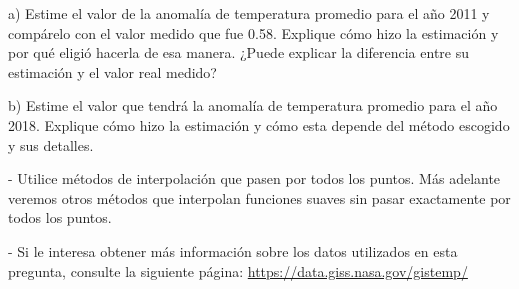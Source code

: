 \documentclass[letter, 11pt]{article}
\begin{document}
\vspace{0.5em}
\noindent a) Estime el valor de la anomalía de temperatura promedio para el año
2011 y compárelo con el valor medido que fue 0.58. Explique cómo hizo la
estimación y por qué eligió hacerla de esa manera. ¿Puede explicar la
diferencia entre su estimación y el valor real medido?

\vspace{0.5em}
\noindent b) Estime el valor que tendrá la anomalía de temperatura promedio
para el año 2018. Explique cómo hizo la estimación y cómo esta depende del
método escogido y sus detalles.

\begin{ayuda}
  - Utilice métodos de interpolación que pasen por todos los puntos. Más
  adelante veremos otros métodos que interpolan funciones suaves sin pasar
  exactamente por todos los puntos.

  \noindent- Si le interesa obtener más información sobre los datos utilizados
  en esta pregunta, consulte la siguiente página:
  \href{https://data.giss.nasa.gov/gistemp/}{https://data.giss.nasa.gov/gistemp/}
\end{ayuda}

\end{document}
